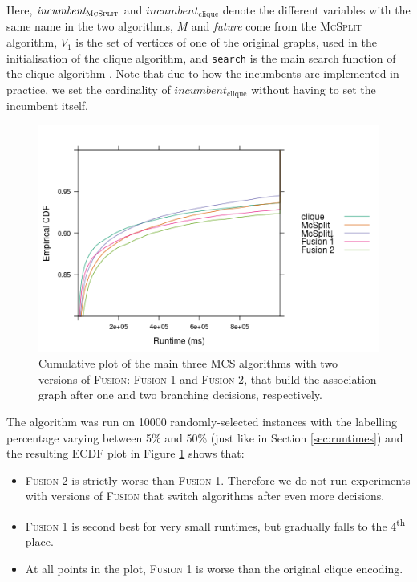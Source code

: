 \documentclass{l4proj}
\theoremstyle{definition}
\theoremstyle{remark}
\begin{document}
Here, $\textit{incumbent}_{\textsc{McSplit}}$ and
$\textit{incumbent}_{\text{clique}}$ denote the different variables with the
same name in the two algorithms, $M$ and \textit{future} come from the
\textsc{McSplit} algorithm, $V_1$ is the set of vertices of one of the
original graphs, used in the initialisation of the clique algorithm, and
\texttt{search} is the main search function of the clique algorithm
\cite{DBLP:conf/cp/McCreeshNPS16}. Note that due to how the incumbents are
implemented in practice, we set the cardinality of
$\textit{incumbent}_{\text{clique}}$ without having to set the incumbent itself.

\begin{figure}
  \centering
  \includegraphics[scale=0.5]{images/fusion_ecdf.png}
  \caption{Cumulative plot of the main three MCS algorithms with two versions of
    \textsc{Fusion}: \textsc{Fusion 1} and \textsc{Fusion 2}, that build the
    association graph after one and two branching decisions, respectively.}
  \label{fig:fusion_ecdf}
\end{figure}

The algorithm was run on \num{10000} randomly-selected instances with
the labelling percentage varying between 5\% and 50\% (just like in Section
\ref{sec:runtimes}) and the resulting ECDF plot in Figure \ref{fig:fusion_ecdf}
shows that:

\begin{itemize}
\item \textsc{Fusion 2} is strictly worse than \textsc{Fusion 1}. Therefore we
  do not run experiments with versions of \textsc{Fusion} that switch algorithms
  after even more decisions.
\item \textsc{Fusion 1} is second best for very small runtimes, but gradually
  falls to the 4\textsuperscript{th} place.
\item At all points in the plot, \textsc{Fusion 1} is worse than the original
  clique encoding.
\end{itemize}
\end{document}

